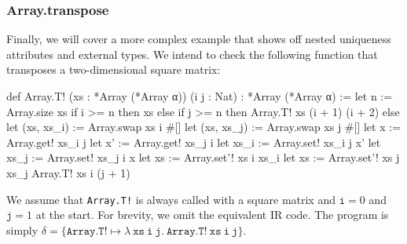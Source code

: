 \subsubsection{Array.transpose}
Finally, we will cover a more complex example that shows off nested uniqueness attributes and external types. We intend to check the following function that transposes a two-dimensional square matrix:
\begin{code}
def Array.T! (xs : *Array (*Array α)) (i j : Nat) : *Array (*Array α) :=
  let n := Array.size xs
  if i >= n then
    xs
  else if j >= n then
    Array.T! xs (i + 1) (i + 2)
  else
    let (xs, xs_i) := Array.swap xs i #[]
    let (xs, xs_j) := Array.swap xs j #[]
    let x := Array.get! xs_i j
    let x' := Array.get! xs_j i
    let xs_i := Array.set! xs_i j x'
    let xs_j := Array.set! xs_j i x
    let xs := Array.set'! xs i xs_i
    let xs := Array.set'! xs j xs_j
    Array.T! xs i (j + 1)
\end{code}
We assume that \texttt{Array.T!} is always called with a square matrix and $\texttt{i} = 0$ and $\texttt{j} = 1$ at the start. For brevity, we omit the equivalent IR code. The program is simply $\delta = \{\texttt{Array.T!} \mapsto \lambda\ \texttt{xs}\ \texttt{i}\ \texttt{j}.\ \texttt{Array.T!}\ \texttt{xs}\ \texttt{i}\ \texttt{j}\}$.

